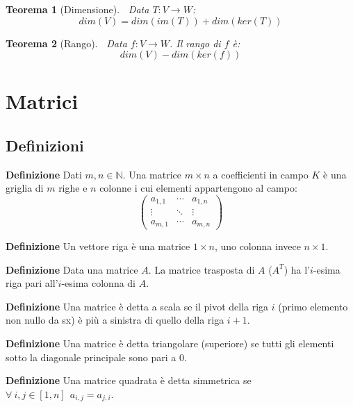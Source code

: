 \documentclass{article}
\newtheorem{theorem}{Teorema}
\begin{document}
\begin{theorem}[Dimensione]$\ $\newline
    Data $T:V\rightarrow W$:
    $$dim(V)=dim(im(T))+dim(ker(T))$$\newline
\end{theorem}

\begin{theorem}[Rango]$\ $\newline
    Data $f:V\rightarrow W$. Il rango di $f$ è:
    $$dim(V)-dim(ker(f))$$\newline
\end{theorem}

\section{Matrici}

\subsection{Definizioni}

\textbf{Definizione} Dati $m,n\in\mathbb{N}$. Una matrice $m\times n$ a coefficienti in campo $K$ è una griglia di $m$ righe e $n$ colonne i cui elementi appartengono al campo:
$$\begin{pmatrix}
    a_{1,1} & \cdots & a_{1,n}\\
    \vdots & \ddots & \vdots\\
    a_{m,1} & \cdots & a_{m,n}
\end{pmatrix}$$\newline

\noindent\textbf{Definizione} Un vettore riga è una matrice $1\times n$, uno colonna invece $n\times1$.\newline

\noindent\textbf{Definizione} Data una matrice $A$. La matrice trasposta di $A$ ($A^T$) ha l'$i$-esima riga pari all'$i$-esima colonna di $A$.\newline

\noindent\textbf{Definizione} Una matrice è detta a scala se il pivot della riga $i$ (primo elemento non nullo da sx) è più a sinistra di quello della riga $i+1$.\newline

\noindent\textbf{Definizione} Una matrice è detta triangolare (superiore) se tutti gli elementi sotto la diagonale principale sono pari a 0.\newline

\noindent\textbf{Definizione} Una matrice quadrata è detta simmetrica se $\forall\ i,j\in[1,n]\ \ a_{i,j}=a_{j,i}$.\newline
\end{document}
